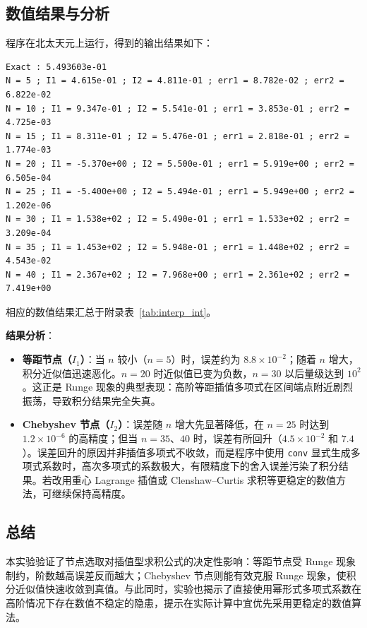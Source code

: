 \documentclass[12pt,a4paper]{article}
\begin{document}
\subsection{数值结果与分析}

程序在北太天元上运行，得到的输出结果如下：
\begin{verbatim}
Exact : 5.493603e-01 
N = 5 ; I1 = 4.615e-01 ; I2 = 4.811e-01 ; err1 = 8.782e-02 ; err2 = 6.822e-02
N = 10 ; I1 = 9.347e-01 ; I2 = 5.541e-01 ; err1 = 3.853e-01 ; err2 = 4.725e-03
N = 15 ; I1 = 8.311e-01 ; I2 = 5.476e-01 ; err1 = 2.818e-01 ; err2 = 1.774e-03
N = 20 ; I1 = -5.370e+00 ; I2 = 5.500e-01 ; err1 = 5.919e+00 ; err2 = 6.505e-04
N = 25 ; I1 = -5.400e+00 ; I2 = 5.494e-01 ; err1 = 5.949e+00 ; err2 = 1.202e-06
N = 30 ; I1 = 1.538e+02 ; I2 = 5.490e-01 ; err1 = 1.533e+02 ; err2 = 3.209e-04
N = 35 ; I1 = 1.453e+02 ; I2 = 5.948e-01 ; err1 = 1.448e+02 ; err2 = 4.543e-02
N = 40 ; I1 = 2.367e+02 ; I2 = 7.968e+00 ; err1 = 2.361e+02 ; err2 = 7.419e+00
\end{verbatim}

相应的数值结果汇总于附录表~\ref{tab:interp_int}。

\textbf{结果分析}：
\begin{itemize}
    \item \textbf{等距节点（\(I_1\)）}：当 \(n\) 较小（\(n=5\)）时，误差约为 \(8.8\times10^{-2}\)；随着 \(n\) 增大，积分近似值迅速恶化。\(n=20\) 时近似值已变为负数，\(n=30\) 以后量级达到 \(10^2\)。这正是 Runge 现象的典型表现：高阶等距插值多项式在区间端点附近剧烈振荡，导致积分结果完全失真。
    \item \textbf{Chebyshev 节点（\(I_2\)）}：误差随 \(n\) 增大先显著降低，在 \(n=25\) 时达到 \(1.2\times10^{-6}\) 的高精度；但当 \(n=35\)、\(40\) 时，误差有所回升（\(4.5\times10^{-2}\) 和 \(7.4\)）。误差回升的原因并非插值多项式不收敛，而是程序中使用 \texttt{conv} 显式生成多项式系数时，高次多项式的系数极大，有限精度下的舍入误差污染了积分结果。若改用重心 Lagrange 插值或 Clenshaw--Curtis 求积等更稳定的数值方法，可继续保持高精度。
\end{itemize}

\subsection{总结}

本实验验证了节点选取对插值型求积公式的决定性影响：等距节点受 Runge 现象制约，阶数越高误差反而越大；Chebyshev 节点则能有效克服 Runge 现象，使积分近似值快速收敛到真值。与此同时，实验也揭示了直接使用幂形式多项式系数在高阶情况下存在数值不稳定的隐患，提示在实际计算中宜优先采用更稳定的数值算法。
\end{document}
